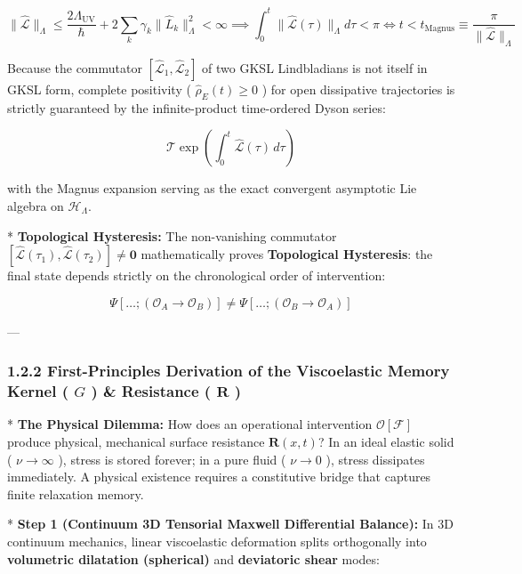 \documentclass[11pt,a4paper]{article}
\theoremstyle{definition}
\theoremstyle{remark}
\begin{document}
\begin{equation}
\boxed{\|\hat{\mathcal{L}}\|_{\Lambda} \le \frac{2 \Lambda_{\text{UV}}}{\hbar} + 2 \sum_k \gamma_k \|\hat{L}_k\|_{\Lambda}^2 < \infty \implies \int_0^t \|\hat{\mathcal{L}}(\tau)\|_{\Lambda} d\tau < \pi \iff t < t_{\text{Magnus}} \equiv \frac{\pi}{\|\hat{\mathcal{L}}\|_{\Lambda}}}
\end{equation}


Because the commutator $[ \hat{\mathcal{L}}_1, \hat{\mathcal{L}}_2 ]$ of two GKSL Lindbladians is not itself in GKSL form, complete positivity ( $\hat{\rho}_E(t) \ge 0$ ) for open dissipative trajectories is strictly guaranteed by the infinite-product time-ordered Dyson series:


\begin{equation}
\mathcal{T} \exp\left( \int_0^t \hat{\mathcal{L}}(\tau) \, d\tau \right)
\end{equation}


with the Magnus expansion serving as the exact convergent asymptotic Lie algebra on $\mathcal{H}_{\Lambda}$.

* \textbf{Topological Hysteresis:} The non-vanishing commutator $[ \hat{\mathcal{L}}(\tau_1), \hat{\mathcal{L}}(\tau_2) ] \neq \mathbf{0}$ mathematically proves \textbf{Topological Hysteresis}: the final state depends strictly on the chronological order of intervention:


\begin{equation}
\Psi[\dots; (\mathcal{O}_A \to \mathcal{O}_B)] \neq \Psi[\dots; (\mathcal{O}_B \to \mathcal{O}_A)]
\end{equation}


---

\subsubsection{1.2.2 First-Principles Derivation of the Viscoelastic Memory Kernel ( $G$ ) \& Resistance ( $\mathbf{R}$ )}
* \textbf{The Physical Dilemma:} How does an operational intervention $\mathcal{O}[\mathcal{F}]$ produce physical, mechanical surface resistance $\mathbf{R}(x, t)$? In an ideal elastic solid ( $\nu \to \infty$ ), stress is stored forever; in a pure fluid ( $\nu \to 0$ ), stress dissipates immediately. A physical existence requires a constitutive bridge that captures finite relaxation memory.

* \textbf{Step 1 (Continuum 3D Tensorial Maxwell Differential Balance):}
In 3D continuum mechanics, linear viscoelastic deformation splits orthogonally into \textbf{volumetric dilatation (spherical)} and \textbf{deviatoric shear} modes:
\end{document}
